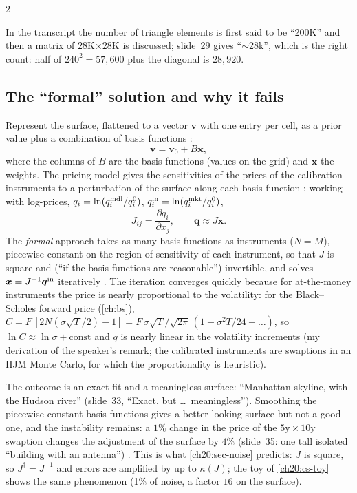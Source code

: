 \begin{paracol}{2}
\begin{coursenote}
In the transcript  the number of triangle elements is first said to be ``200K'' and then a matrix of $28$K$\times28$K is discussed; slide~29 gives ``$\sim$28k'', which is the right count: half of $240^2=57{,}600$ plus the diagonal is $28{,}920$.
\end{coursenote}

\subsection{The ``formal'' solution and why it fails}\label{ch20:sec-volformal}
Represent the surface, flattened to a vector $\bm v$ with one entry per cell, as a prior value plus a combination of basis functions :
\begin{equation}\label{ch20:eq-vbasis}
  \bm v=\bm v_0+B\bm x,
\end{equation}
where the columns of $B$ are the basis functions (values on the grid) and $\bm x$ the weights. The pricing model gives the sensitivities of the prices of the calibration instruments to a perturbation of the surface along each basis function ; working with
log-prices, $q_i=\ln(q_i^{\rm mdl}/q_i^{0})$, $q_i^{\rm in}=\ln(q_i^{\rm mkt}/q_i^{0})$,
\begin{equation}\label{ch20:eq-jac}
  J_{ij}=\frac{\partial q_i}{\partial x_j},\qquad \bm q\approx J\bm x .
\end{equation}
The \emph{formal} approach takes as many basis functions as instruments ($N=M$), piecewise constant on the region of sensitivity of each instrument, so that $J$ is square and (``if the basis functions are reasonable'') invertible, and solves $\bm x=J^{-1}\bm q^{\rm in}$ iteratively .
The iteration converges quickly because for at-the-money instruments the price is nearly proportional to the volatility: for the Black--Scholes forward price (\cref{ch:bs}), $C=F\,[2N(\sigma\sqrt T/2)-1]=F\,\sigma\sqrt{T}/\sqrt{2\pi}\,(1-\sigma^2T/24+\dots)$, so $\ln C\approx\ln\sigma+\text{const}$ and $q$ is nearly linear in the volatility
increments (my derivation of the speaker's remark; the calibrated instruments are swaptions in an HJM Monte Carlo, for which the proportionality is heuristic).

The outcome is an exact fit and a meaningless surface: ``Manhattan skyline, with the Hudson river''  (slide~33, ``Exact, but \dots\ meaningless''). Smoothing the piecewise-constant basis functions gives a better-looking surface but not a good one, and the instability
remains: a $1\%$ change in the price of the $5\text{y}\times10\text{y}$ swaption changes the adjustment of the surface by $4\%$ (slide~35: one tall isolated ``building with an antenna'') . This is what \cref{ch20:sec-noise} predicts: $J$ is square, so
$J^\dagger=J^{-1}$ and errors are amplified by up to $\kappa(J)$; the toy of \cref{ch20:cs-toy} shows the same phenomenon (1\% of noise, a factor $16$ on the surface).


\end{paracol}
